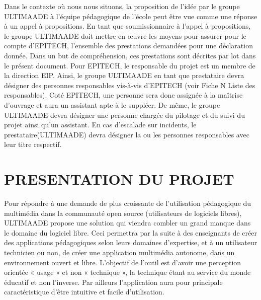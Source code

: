 \documentclass{ultimaade-fr}
\begin{document}
Dans le contexte où nous nous situons, la proposition de l’idée par le groupe ULTIMAADE à l’équipe   pédagogique	de  l’école  peut  être  vue  comme  une  réponse  à  un  appel  à propositions.
En tant que soumissionnaire à l’appel à propositions, le groupe ULTIMAADE doit mettre en
œuvre les moyens pour assurer pour le compte d’EPITECH, l’ensemble des prestations demandées pour une déclaration donnée.
Dans	un but de compréhension, ces prestations sont décrites par lot dans le présent document.
Pour EPITECH, le responsable du projet est un membre de la direction EIP.
Ainsi, le groupe ULTIMAADE en tant que prestataire devra désigner des personnes responsables vis-à-vis d’EPITECH (voir Fiche N Liste des responsables).
Coté  EPITECH,  une  personne  sera  donc  assignée  à  la  maîtrise  d’ouvrage  et  aura  un
assistant apte à le suppléer. De même, le groupe ULTIMAADE devra désigner une personne chargée du pilotage et du suivi du projet ainsi qu’un assistant.
En  cas  d’escalade  sur  incidents,  le  prestataire(ULTIMAADE)  devra  désigner  la  ou  les personnes responsables avec leur titre respectif.

\newpage
\chapter{PRESENTATION DU PROJET}

Pour  répondre  à  une  demande  de  plus  croissante  de  l’utilisation  pédagogique  du multimédia dans la communauté open source (utilisateurs de logiciels libres), ULTIMAADE propose une solution qui viendra  combler un grand manque dans le domaine du logiciel libre. Ceci permettra par la suite à des enseignants de créer des applications pédagogiques selon  leurs  domaines  d’expertise,  et  à  un  utilisateur  technicien  ou  non,  de  créer  une application multimédia autonome, dans un environnement ouvert et libre.
L’objectif de l’outil est d’avoir une perception orientée « usage » et non « technique », la technique étant  au  service du monde éducatif et non l’inverse. Par ailleurs l’application aura pour principale caractéristique d’être intuitive et facile d’utilisation.
\end{document}
